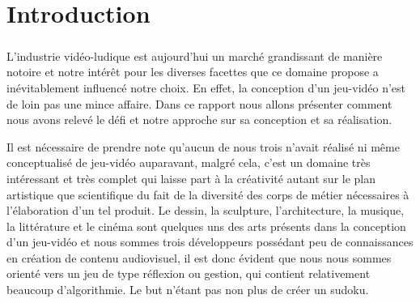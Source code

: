 \documentclass[a4paper,10pt,openany,oneside]{report}
\begin{document}
\tableofcontents


\setcounter{page}{0}
\chapter*{Introduction}
\thispagestyle{headings}
\paragraph{}
L'industrie vidéo-ludique est aujourd'hui un marché grandissant de manière notoire et notre intérêt pour les diverses facettes que ce domaine propose a inévitablement influencé notre choix.
En effet, la conception d'un jeu-vidéo n'est de loin pas une mince affaire. Dans ce rapport nous allons présenter comment nous avons relevé le défi et notre approche sur sa conception et sa réalisation.

Il est nécessaire de prendre note qu'aucun de nous trois n'avait réalisé ni même conceptualisé de jeu-vidéo auparavant, malgré cela, c'est un domaine très intéressant et très complet qui laisse part à la créativité autant sur le plan artistique que scientifique du fait de la diversité des corps de métier nécessaires à l'élaboration d'un tel produit. Le dessin, la sculpture, l'architecture, la musique, la littérature et le cinéma sont quelques uns des arts présents dans la conception d'un jeu-vidéo et nous sommes trois développeurs possédant peu de connaissances en création de contenu audiovisuel, il est donc évident que nous nous sommes orienté vers un jeu de type réflexion ou gestion, qui contient relativement beaucoup d'algorithmie. Le but n'étant pas non plus de créer un sudoku.
\end{document}
